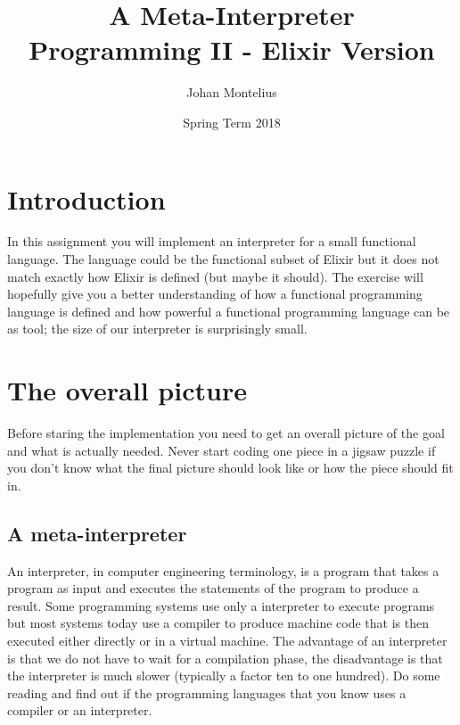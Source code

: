 \documentclass[a4paper,11pt]{article}
\begin{document}

\title{
    \textbf{A Meta-Interpreter}\\
    \large{Programming II - Elixir Version}
}
\author{Johan Montelius}
\date{Spring Term 2018}
\maketitle
{}



\section*{Introduction}

In this assignment you will implement an interpreter for a small
functional language. The language could be the functional subset of
Elixir but it does not match exactly how Elixir is defined (but maybe
it should). The exercise will hopefully give you a better
understanding of how a functional programming language is defined and
how powerful a functional programming language can be as tool; the
size of our interpreter is surprisingly small. 



\section{The overall picture}

Before staring the implementation you need to get an overall picture
of the goal and what is actually needed. Never start coding one piece
in a jigsaw puzzle if you don't know what the final picture should look
like or how the piece should fit in.

\subsection{A meta-interpreter}
An interpreter, in computer engineering terminology, is a program that
takes a program as input and executes the statements of the program to
produce a result. Some programming systems use only a interpreter to
execute programs but most systems today use a compiler to produce
machine code that is then executed either directly or in a
virtual machine. The advantage of an interpreter is that we do not
have to wait for a compilation phase, the disadvantage is that the
interpreter is much slower (typically a factor ten to one hundred).
Do some reading and find out if the programming languages that you
know uses a compiler or an interpreter.
\end{document}
